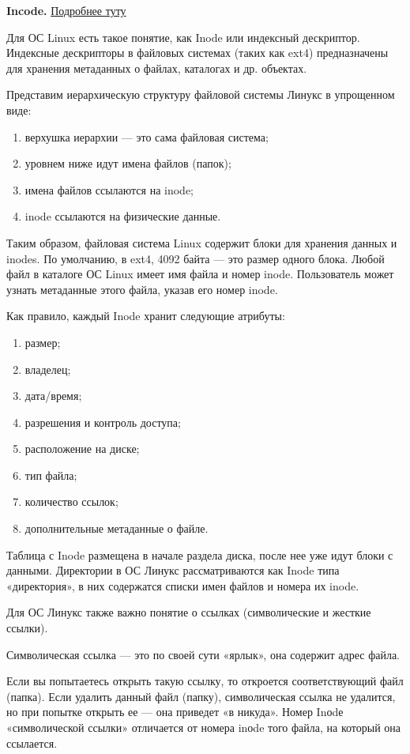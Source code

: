 \documentclass{article}
\begin{document}
\textbf{Incode.} \href{https://freehost.com.ua/faq/articles/inode-v-linux--chto-eto-takoe/}{Подробнее туту}

Для ОС Linux есть такое понятие, как Inode или индексный дескриптор. Индексные дескрипторы в файловых системах (таких как ext4) предназначены для хранения метаданных о файлах, каталогах и др. объектах.

Представим иерархическую структуру файловой системы Линукс в упрощенном виде:
\begin{enumerate}
	\item верхушка иерархии — это сама файловая система;
	\item уровнем ниже идут имена файлов (папок);
	\item имена файлов ссылаются на inode;
	\item inode ссылаются на физические данные.
\end{enumerate}

Таким образом, файловая система Linux содержит блоки для хранения данных и inodes. По умолчанию, в ext4, 4092 байта — это размер одного блока. Любой файл в каталоге ОС Linux имеет имя файла и номер inode. Пользователь может узнать метаданные этого файла, указав его номер inode.

Как правило, каждый Inode хранит следующие атрибуты:
\begin{enumerate}
	\item размер;
	\item владелец;
	\item дата/время;
	\item разрешения и контроль доступа;
	\item расположение на диске;
	\item тип файла;
	\item количество ссылок;
	\item дополнительные метаданные о файле.
\end{enumerate}

Таблица с Inode размещена в начале раздела диска, после нее уже идут блоки с данными. Директории в ОС Линукс рассматриваются как Inode типа «директория», в них содержатся списки имен файлов и номера их inode.

Для ОС Линукс также важно понятие о ссылках (символические и жесткие ссылки).

Символическая ссылка — это по своей сути «ярлык», она содержит адрес файла.

Если вы попытаетесь открыть такую ссылку, то откроется соответствующий файл (папка). Если удалить данный файл (папку), символическая ссылка не удалится, но при попытке открыть ее — она приведет «в никуда». Номер Inоdе «символической ссылки» отличается от номера inоde того файла, на который она ссылается.
\end{document}
